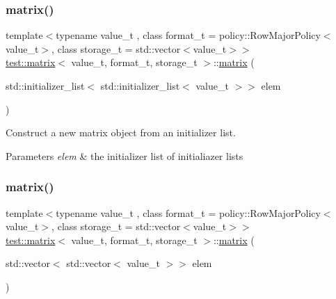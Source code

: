 \subsubsection{\texorpdfstring{matrix()}{matrix()}\hspace{0.1cm}{\footnotesize\ttfamily [2/4]}}
{\footnotesize\ttfamily template$<$typename value\+\_\+t , class format\+\_\+t  = policy\+::\+Row\+Major\+Policy$<$value\+\_\+t$>$, class storage\+\_\+t  = std\+::vector$<$value\+\_\+t$>$$>$ \\
\mbox{\hyperlink{classtest_1_1matrix}{test\+::matrix}}$<$ value\+\_\+t, format\+\_\+t, storage\+\_\+t $>$\+::\mbox{\hyperlink{classtest_1_1matrix}{matrix}} (\begin{DoxyParamCaption}\item[{std\+::initializer\+\_\+list$<$ std\+::initializer\+\_\+list$<$ value\+\_\+t $>$$>$}]{elem }\end{DoxyParamCaption})\hspace{0.3cm}{\ttfamily [inline]}}



Construct a new matrix object from an initializer list. 


\begin{DoxyParams}{Parameters}
{\em elem} & the initializer list of initialiazer lists \\
\hline
\end{DoxyParams}
\mbox{\label{classtest_1_1matrix_abf4537692c748dbec4ffdcc616e83592}} 
\subsubsection{\texorpdfstring{matrix()}{matrix()}\hspace{0.1cm}{\footnotesize\ttfamily [3/4]}}
{\footnotesize\ttfamily template$<$typename value\+\_\+t , class format\+\_\+t  = policy\+::\+Row\+Major\+Policy$<$value\+\_\+t$>$, class storage\+\_\+t  = std\+::vector$<$value\+\_\+t$>$$>$ \\
\mbox{\hyperlink{classtest_1_1matrix}{test\+::matrix}}$<$ value\+\_\+t, format\+\_\+t, storage\+\_\+t $>$\+::\mbox{\hyperlink{classtest_1_1matrix}{matrix}} (\begin{DoxyParamCaption}\item[{std\+::vector$<$ std\+::vector$<$ value\+\_\+t $>$$>$}]{elem }\end{DoxyParamCaption})\hspace{0.3cm}{\ttfamily [inline]}}



